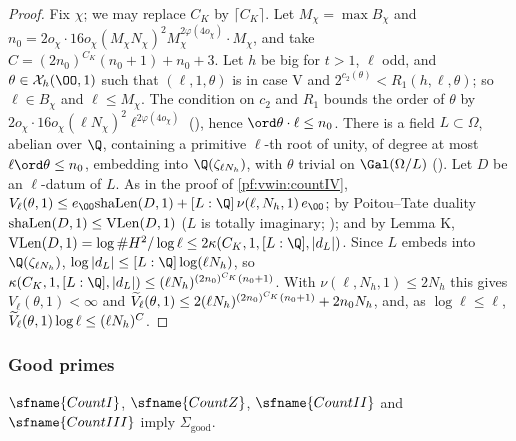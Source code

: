 \begin{proof}
Fix $\chi$; we may replace $C_K$ by $\lceil C_K\rceil$. Let $M_\chi=\max B_\chi$ and
$n_0=2o_\chi\cdot16o_\chi(M_\chi N_\chi)^2M_\chi^{2\varphi(4o_\chi)}\cdot M_\chi$, and take $C=(2n_0)^{C_K}(n_0+1)+n_0+3$. Let $h$ be big for $t>1$, $\ell$ odd, and
$\theta\in\vwinX_h(\OO,1)$ such that $(\ell,1,\theta)$ is in case V and $2^{c_2(\theta)}<R_1(h,\ell,\theta)$; so $\ell\in B_\chi$ and $\ell\le M_\chi$. The condition on
$c_2$ and $R_1$ bounds the order of $\theta$ by $2o_\chi\cdot16o_\chi(\ell N_\chi)^2\ell^{2\varphi(4o_\chi)}$
(), hence $\ord\theta\cdot\ell\le n_0$. There is a field $L\subset\Omega$, abelian over $\Q$, containing a
primitive $\ell$-th root of unity, of degree at most $\ell\ord\theta\le n_0$, embedding into $\Q(\zeta_{\ell N_h})$, with $\theta$ trivial on
$\Gal(\Omega/L)$ (). Let $D$ be an $\ell$-datum of $L$. As in the proof of \cref{pf:vwin:countIV},
$V_\ell(\theta,1)\le e_\OO\vwinsh(D,1)+[L:\Q]\,\nu(\ell,N_h,1)\,e_\OO$; by Poitou--Tate duality $\mathrm{shaLen}(D,1)\le\mathrm{VLen}(D,1)$ ($L$ is totally
imaginary; ); and by Lemma K, $\vwinVL(D,1)=\log\#H^2/\log\ell\le2\kappa(C_K,1,[L:\Q],|d_L|)$. Since $L$
embeds into $\Q(\zeta_{\ell N_h})$, $\log|d_L|\le[L:\Q]\log(\ell N_h)$, so $\kappa(C_K,1,[L:\Q],|d_L|)\le(\ell N_h)^{(2n_0)^{C_K}(n_0+1)}$. With
$\nu(\ell,N_h,1)\le2N_h$ this gives $V_\ell(\theta,1)<\infty$ and $\widetilde V_\ell(\theta,1)\le2(\ell N_h)^{(2n_0)^{C_K}(n_0+1)}+2n_0N_h$, and, as
$\log\ell\le\ell$, $\widetilde V_\ell(\theta,1)\log\ell\le(\ell N_h)^C$.
\end{proof}
\subsubsection{Good primes}

\begin{proposition}\label{pf:vwin:sumout}
$\sfname{CountI}$, $\sfname{CountZ}$, $\sfname{CountII}$ and $\sfname{CountIII}$ imply $\Sigma_{\mathrm{good}}$.
\end{proposition}

